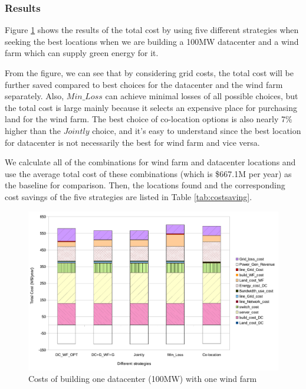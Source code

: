 \subsubsection{Results}
Figure \ref{fig:cost1dc1wf} shows the results of the total cost by using five different strategies when seeking the best locations when we are building a 100MW datacenter and a wind farm which can supply green energy for it.

From the figure, we can see that by considering grid costs, the total cost will be further saved compared to best choices for the datacenter and the wind farm separately. Also, $Min\_Loss$ can achieve minimal losses of all possible choices, but the total cost is large mainly because it selects an expensive place for purchasing land for the wind farm. The best choice of co-location options is also nearly 7\% higher than the $Jointly$ choice, and it's easy to understand since the best location for datacenter is not necessarily the best for wind farm and vice versa.

We calculate all of the combinations for wind farm and datacenter locations and use the average total cost of these combinations (which is \$667.1M per year) as the baseline for comparison. Then, the locations found and the corresponding cost savings of the five strategies are listed in Table \ref{tab:costsaving}.

\begin{figure}[ht]
\centering
\includegraphics[width=1\columnwidth]{img/cost-one-dc-one-wf}
\caption{Costs of building one datacenter (100MW) with one wind farm}
\label{fig:cost1dc1wf}
\end{figure}


